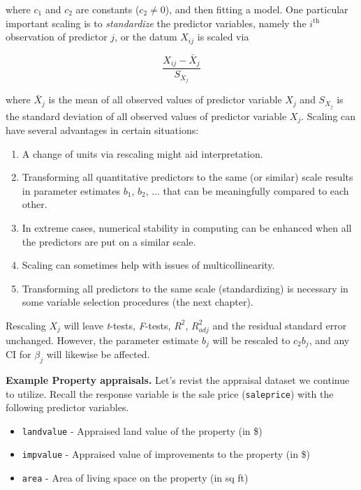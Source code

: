 \documentclass[
]{book}
\providecommand{\tightlist}{%
  \setlength{\itemsep}{0pt}\setlength{\parskip}{0pt}}
\begin{document}
where \(c_1\) and \(c_2\) are constants (\(c_2 \neq 0\)), and then fitting a model. One particular important scaling is to \emph{standardize} the predictor variables, namely the \(i^\mathrm{th}\) observation of predictor \(j\), or the datum \(X_{ij}\) is scaled via

\[\frac{X_{ij} - \bar{X}_j}{S_{X_j}}\]

where \(\bar{X}_j\) is the mean of all observed values of predictor variable \(X_j\) and \(S_{X_j}\) is the standard deviation of all observed values of predictor variable \(X_j\).
Scaling can have several advantages in certain situations:

\begin{enumerate}
\def\labelenumi{\arabic{enumi}.}
\tightlist
\item
  A change of units via rescaling might aid interpretation.
\item
  Transforming all quantitative predictors to the same (or similar) scale results in parameter estimates \(b_1\), \(b_2\), \(\ldots\) that can be meaningfully compared to each other.
\item
  In extreme cases, numerical stability in computing can be enhanced when all the predictors are put on a similar scale.
\item
  Scaling can sometimes help with issues of multicollinearity.
\item
  Transforming all predictors to the same scale (standardizing) is necessary in some variable selection procedures (the next chapter).
\end{enumerate}

Rescaling \(X_j\) will leave \emph{t}-tests, \emph{F}-tests, \(R^2\), \(R_{adj}^2\) and the residual standard error unchanged. However, the parameter estimate \(b_j\) will be rescaled to \(c_2 b_j\), and any CI for \(\beta_j\) will likewise be affected.

\textbf{Example Property appraisals.} Let's revist the appraisal dataset we continue to utilize. Recall the response variable is the sale price (\texttt{saleprice}) with the following predictor variables.

\begin{itemize}
\tightlist
\item
  \texttt{landvalue} - Appraised land value of the property (in \$)
\item
  \texttt{impvalue} - Appraised value of improvements to the property (in \$)
\item
  \texttt{area} - Area of living space on the property (in sq ft)
\end{itemize}
\end{document}

